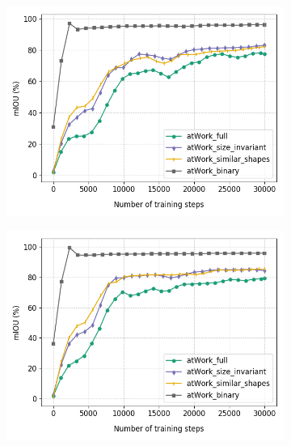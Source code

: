 	\begin{figure}
		\begin{subfigure}{.5\textwidth}
			\centering
			\includegraphics[width=1\linewidth]{images/mobi_4vars}
			\label{Fig:mobivarsa}
			\caption{}
		\end{subfigure}
		\begin{subfigure}{.5\textwidth}
			\centering
			\includegraphics[width=1\linewidth]{images/mobi_4vars_white}
			\label{Fig:mobivarsb}
			\caption{}
		\end{subfigure}
		\begin{subfigure}{.5\textwidth}
			\centering

\end{subfigure}
\end{figure}
